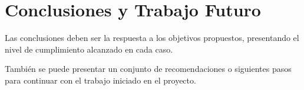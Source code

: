 \chapter{Conclusiones y Trabajo Futuro}\label{concl}



\begin{tcolorbox}[width=\textwidth,colback={white},title={\textbf{Lineamientos del Capítulo Conclusiones y Trabajo Futuro}},colbacktitle=black,coltitle=white]    
Las conclusiones deben ser la respuesta a los objetivos propuestos, presentando el nivel de cumplimiento alcanzado en cada caso. 

También se puede presentar un conjunto de recomendaciones o siguientes pasos para continuar con el trabajo iniciado en el proyecto.

\end{tcolorbox}   